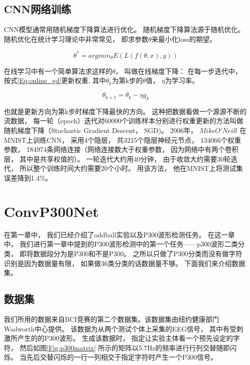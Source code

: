 \subsection{CNN网络训练}

CNN模型通常用随机梯度下降\cite{nemirovski1978cezari}算法进行优化。 随机梯度下降算法源于随机优化。 随机优化在统计学习理论中非常常见， 即求参数$\theta$来最小化loss的期望。


\begin{equation}
\label{Eq:stocastic_optimization}
	\theta^* = arg min_{\theta} E(L(f(\theta,x),y))
\end{equation}


在线学习中有一个简单算法求这样的$\theta$， 叫做在线梯度下降\cite{zinkevich2003online}： 在每一步迭代中， 按式\ref{Eq:online_gd}更新权重, 其中$\theta_k$为第k步的$\theta$值， $\eta$为学习率。


\begin{equation}
\label{Eq:online_gd}
	\theta_{k+1} = \theta_k - \eta g_k
\end{equation}

也就是更新方向为第k步时梯度下降最快的方向。 这种把数据看做一个源源不断的流数据， 每一轮（epoch）迭代对60000个训练样本分别进行权重更新的方法叫做随机梯度下降（Stochastic Gradient Descent， SGD)。 2006年， $Mike O'Neill$ 在MNIST上训练CNN， 采用4个隐层， 共3215个隐层神经元节点， 134066个权重参数， 184974条网络连接（网络连接数大于权重参数， 因为网络中有两个卷积层， 其中是共享权值的）。 一轮迭代大约用40分钟， 由于收敛大约需要30轮迭代， 所以整个训练时间大约需要20个小时。 用该方法， 他在MNIST上将测试集误差降到1.4\%。





\section{ConvP300Net}\label{sec:cnn_configure}
在第一章中， 我们已经介绍了oddball实验以及P300波形检测任务。 在这一章中， 我们进行第一章中提到的P300波形检测中的第一个任务——p300波形二类分类， 即将数据段分为是P300和不是P300。 之所以只做了P300分类而没有做字符识别是因为数据量有限， 如果做36类分类的话数据量不够。 下面我们来介绍数据集。


\subsection{数据集}
我们所用的数据来自BCI竞赛的第二个数据集\cite{blankertz2006bci}。该数据集由纽约健康部门Wadworth中心提供。 该数据为从两个测试个体上采集的EEG信号， 其中有受刺激所产生的的P300波形。 生成该数据时， 指定让实验主体看一个预先设定的字符， 然后如图\ref{Fig:p300matrix} 所示的矩阵以5.7Hz的频率进行行列交替随即闪烁。 当先后交替闪烁的一行一列相交于指定字符时产生一个P300信号。 

